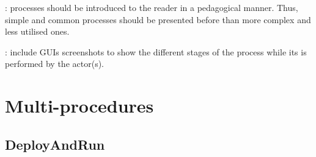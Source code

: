 % 
% 




: processes should be introduced to the
reader in a pedagogical manner. Thus, simple and common processes should be presented before
than more complex and less utilised ones.

: include GUIs screenshots to show the
different stages of the process while its is performed by the actor(s).






\section{Multi-procedures}



\subsection{DeployAndRun}

